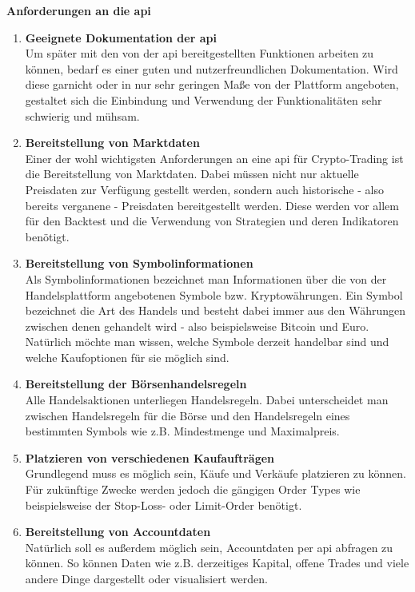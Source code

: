 \documentclass[oneside]{ausarbeitung}
\begin{document}
\textbf{Anforderungen an die \ac{api}}
\begin{enumerate}
	\item \textbf{Geeignete Dokumentation der \ac{api}} \\
		Um später mit den von der \ac{api} bereitgestellten Funktionen arbeiten
		zu können, bedarf es einer guten und nutzerfreundlichen Dokumentation.
		Wird diese garnicht oder in nur sehr geringen Maße von der Plattform
		angeboten, gestaltet sich die Einbindung und Verwendung der 
		Funktionalitäten sehr schwierig und mühsam.
	\item \textbf{Bereitstellung von Marktdaten} \\
		Einer der wohl wichtigsten Anforderungen an eine \ac{api} für
		Crypto-Trading ist die Bereitstellung von Marktdaten. Dabei müssen nicht
		nur aktuelle Preisdaten zur Verfügung gestellt werden, sondern auch
		historische - also bereits verganene - Preisdaten bereitgestellt werden.
		Diese werden vor allem für den Backtest und die Verwendung von
		Strategien und deren Indikatoren benötigt. 
	\item \textbf{Bereitstellung von Symbolinformationen} \\
		Als Symbolinformationen bezeichnet man Informationen über die von der
		Handelsplattform angebotenen Symbole bzw. Kryptowährungen. Ein Symbol
		bezeichnet die Art des Handels und besteht dabei immer aus den Währungen
		zwischen denen gehandelt wird - also beispielsweise Bitcoin und Euro.
		Natürlich möchte man wissen, welche Symbole derzeit handelbar sind und
		welche Kaufoptionen für sie möglich sind.
	\item \textbf{Bereitstellung der Börsenhandelsregeln} \\
		Alle Handelsaktionen unterliegen Handelsregeln. Dabei unterscheidet man
		zwischen Handelsregeln für die Börse und den Handelsregeln eines
		bestimmten Symbols wie z.B. Mindestmenge und Maximalpreis.
	\item \textbf{Platzieren von verschiedenen Kaufaufträgen} \\
		Grundlegend muss es möglich sein, Käufe und Verkäufe platzieren zu
		können. Für zukünftige Zwecke werden jedoch die gängigen Order Types
		wie beispielsweise der Stop-Loss- oder Limit-Order benötigt. 
	\item \textbf{Bereitstellung von Accountdaten} \\
		Natürlich soll es außerdem möglich sein, Accountdaten per \ac{api}
		abfragen zu können. So können Daten wie z.B. derzeitiges Kapital, 
		offene Trades und viele andere Dinge dargestellt oder visualisiert
		werden.
\end{enumerate}
\end{document}
